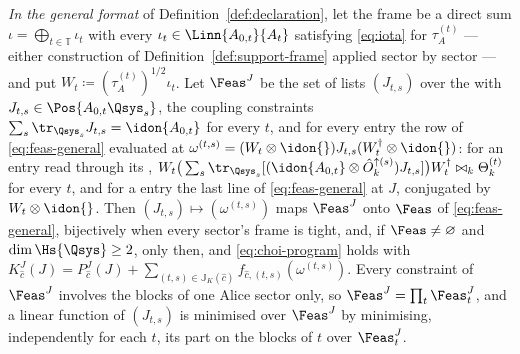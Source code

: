 \begin{theorem}
\emph{In the general format} of Definition~\ref{def:declaration}, let the
frame be a direct sum $\iota=\bigoplus_{t\in\mathbb{T}}\iota_t$ with every
$\iota_t\in\Linn{A_{0,t}}{A_t}$ satisfying \eqref{eq:iota} for
$\tau^{(t)}_A$ --- either construction of Definition~\ref{def:support-frame}
applied sector by sector --- and put $W_t\coloneqq(\tau^{(t)}_A)^{1/2}\iota_t$. Let $\Feas^{J}$
be the set of lists $(J_{t,s})$ over the  with
$J_{t,s}\in\Pos{A_{0,t}\Qsys_s}$, the coupling constraints
$\sum_s\tr_{\Qsys_s}J_{t,s}=\idon{A_{0,t}}$ for every $t$, and for every
entry the row of \eqref{eq:feas-general} evaluated at
$\omega^{(t,s)}=(W_t\otimes\idon{})J_{t,s}(W_t^{\dagger}\otimes\idon{})$: for
an entry read through its ,
$W_t\big(\sum_s\tr_{\Qsys_s}[(\idon{A_{0,t}}\otimes\hat O^{\uparrow(s)}_k)
J_{t,s}]\big)W_t^{\dagger}\bowtie_k\Theta^{(t)}_k$ for every $t$, and for a
 entry the last line of \eqref{eq:feas-general} at $J$,
conjugated by $W_t\otimes\idon{}$. Then $(J_{t,s})\mapsto(\omega^{(t,s)})$
maps $\Feas^{J}$ onto $\Feas$ of \eqref{eq:feas-general}, bijectively when
every sector's frame is tight, and, if $\Feas\ne\varnothing$ and
$\dim\Hs{\Qsys}\ge2$, only then, and \eqref{eq:choi-program} holds with
$K^{J}_{\hat c}(J)=P^{J}_{\hat c}(J)+\sum_{(t,s)\in\mathbb{J}_K(\hat c)}
f_{\hat c,(t,s)}(\omega^{(t,s)})$. Every constraint of $\Feas^{J}$ involves
the blocks of one Alice sector only, so $\Feas^{J}=\prod_t\Feas^{J}_t$, and a
linear function of $(J_{t,s})$ is minimised over $\Feas^{J}$ by minimising,
independently for each $t$, its part on the blocks of $t$ over
$\Feas^{J}_t$.
\end{theorem}

